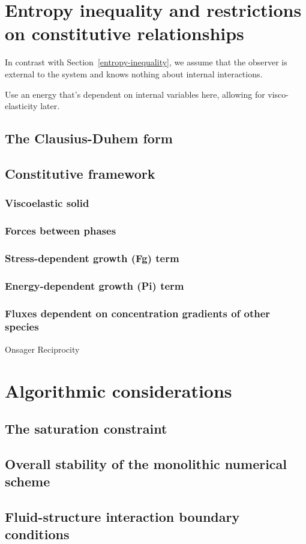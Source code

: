 \section{Entropy inequality and restrictions on constitutive
  relationships}
\label{eu-entropy-inequality}

In contrast with Section~\ref{entropy-inequality}, we assume that the
observer is external to the system and knows nothing about internal
interactions. 

Use an energy that's dependent on internal variables here, allowing for visco-elasticity later.
\subsection{The Clausius-Duhem form}
\subsection{Constitutive framework}
\label{eu-constitutive-framework}
\subsubsection{Viscoelastic solid}
\label{eu-viscoelastic-solid}
\subsubsection{Forces between phases}
\subsubsection{Stress-dependent growth (Fg) term}
\label{eu-stress-dependent-source}
\subsubsection{Energy-dependent growth (Pi) term}
\subsubsection{Fluxes dependent on concentration gradients of other
  species}
\label{onsager-reciprocity}
Onsager Reciprocity
\section{Algorithmic considerations}
\label{eu-algorithmic-considerations}
\subsection{The saturation constraint}
\subsection{Overall stability of the monolithic numerical scheme}
\subsection{Fluid-structure interaction boundary conditions}


%


